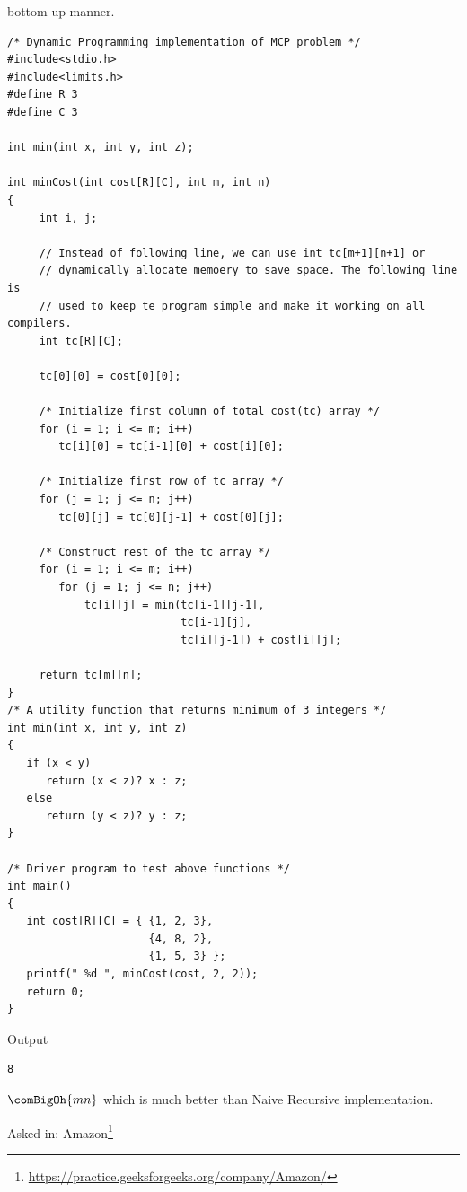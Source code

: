 bottom up manner.
\begin{lstlisting}[style=raycppnewsnippet]
/* Dynamic Programming implementation of MCP problem */
#include<stdio.h>
#include<limits.h>
#define R 3
#define C 3
 
int min(int x, int y, int z);
 
int minCost(int cost[R][C], int m, int n)
{
     int i, j;
 
     // Instead of following line, we can use int tc[m+1][n+1] or 
     // dynamically allocate memoery to save space. The following line is
     // used to keep te program simple and make it working on all compilers.
     int tc[R][C];  
 
     tc[0][0] = cost[0][0];
 
     /* Initialize first column of total cost(tc) array */
     for (i = 1; i <= m; i++)
        tc[i][0] = tc[i-1][0] + cost[i][0];
 
     /* Initialize first row of tc array */
     for (j = 1; j <= n; j++)
        tc[0][j] = tc[0][j-1] + cost[0][j];
 
     /* Construct rest of the tc array */
     for (i = 1; i <= m; i++)
        for (j = 1; j <= n; j++)
            tc[i][j] = min(tc[i-1][j-1], 
                           tc[i-1][j], 
                           tc[i][j-1]) + cost[i][j];
 
     return tc[m][n];
}
/* A utility function that returns minimum of 3 integers */
int min(int x, int y, int z)
{
   if (x < y)
      return (x < z)? x : z;
   else
      return (y < z)? y : z;
}
 
/* Driver program to test above functions */
int main()
{
   int cost[R][C] = { {1, 2, 3},
                      {4, 8, 2},
                      {1, 5, 3} };
   printf(" %d ", minCost(cost, 2, 2));
   return 0;
}
\end{lstlisting}
Output
\begin{lstlisting}[style=rayio]
8
\end{lstlisting}
 $\comBigOh{mn}$ which is
much better than Naive Recursive implementation.

Asked in:
Amazon\footnote{\url{https://practice.geeksforgeeks.org/company/Amazon/}}


